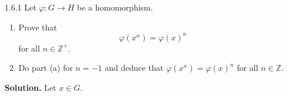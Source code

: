 \documentclass[9pt]{article}
\newcommand{\Z}{\mathbb{Z}}
\begin{document}
\begin{enumerate}
   \item[1.6.1]   Let $\varphi : G \rightarrow H$ be a homomorphism.
                  \begin{enumerate}
                     \item Prove that
                           \begin{equation} \label{1_6_1_0}
                              \varphi(x^n) = \varphi(x)^n
                           \end{equation}
                           for all $n \in \Z^+$.
                     \item Do part (a) for $n = -1$ and deduce that
                           $\varphi(x^n) = \varphi(x)^n$ for all $n \in \Z$.
                  \end{enumerate}

      \textbf{Solution.} Let $x \in G$.


\end{enumerate}
\end{document}

